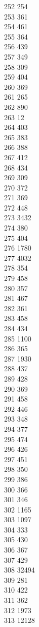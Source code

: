 { 252	254 \\
 253	361 \\
 254	461 \\
 255	364 \\
 256	439 \\
 257	349 \\
 258	309 \\
 259	404 \\
 260	369 \\
 261	265 \\
 262	890 \\
 263	12 \\
 264	403 \\
 265	383 \\
 266	388 \\
 267	412 \\
 268	434 \\
 269	309 \\
 270	372 \\
 271	369 \\
 272	448 \\
 273	3432 \\
 274	380 \\
 275	404 \\
 276	1780 \\
 277	4032 \\
 278	354 \\
 279	458 \\
 280	357 \\
 281	467 \\
 282	361 \\
 283	458 \\
 284	434 \\
 285	1100 \\
 286	365 \\
 287	1930 \\
 288	437 \\
 289	428 \\
 290	369 \\
 291	458 \\
 292	446 \\
 293	348 \\
 294	377 \\
 295	474 \\
 296	426 \\
 297	451 \\
 298	350 \\
 299	386 \\
 300	366 \\
 301	346 \\
 302	1165 \\
 303	1097 \\
 304	333 \\
 305	430 \\
 306	367 \\
 307	429 \\
 308	32494 \\
 309	281 \\
 310	422 \\
 311	362 \\
 312	1973 \\
 313	12128 \\
}
